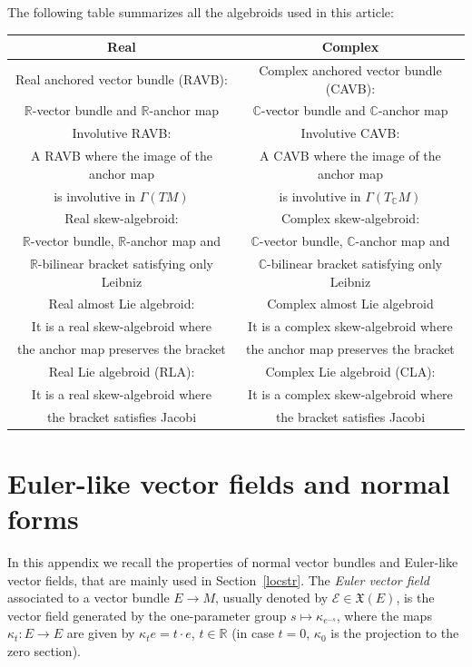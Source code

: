 \documentclass[11pt]{article}
\numberwithin{equation}{section}
\numberwithin{equation}{section}
\newcommand{\R}{{\mathbb{R}}}
\newcommand{\C}{{\mathbb{C}}}
\begin{document}
The following table summarizes all the algebroids used in this article:
\begin{center}
    \begin{tabular}{@{}c|c@{}}
      Real & Complex\\
      \hline
Real anchored vector bundle (RAVB): & Complex anchored vector bundle (CAVB):\\
$\R$-vector bundle and $\R$-anchor map & $\C$-vector bundle and $\C$-anchor map\\
\hline
Involutive RAVB: & Involutive CAVB:\\
A RAVB where the image of the anchor map & A CAVB where the image of the anchor map\\
 is involutive in $\Gamma(TM)$ & is involutive in $\Gamma(T_{\C}M)$ \\
\hline
 Real skew-algebroid: & Complex skew-algebroid: \\
$\R$-vector bundle, $\R$-anchor map and &
$\C$-vector bundle, $\C$-anchor map and\\
$\R$-bilinear bracket satisfying only Leibniz & $\C$-bilinear bracket satisfying only Leibniz \\
\hline
Real almost Lie algebroid: & Complex almost Lie algebroid \\
It is a real skew-algebroid where &
It is a complex skew-algebroid where\\
 the anchor map preserves the bracket & the anchor map preserves the bracket \\
\hline
Real Lie algebroid (RLA): & Complex Lie algebroid (CLA):\\
It is a real skew-algebroid where &
It is a complex skew-algebroid where\\
 the bracket satisfies Jacobi & the bracket satisfies Jacobi \\
\hline
    \end{tabular}
    \end{center}

\section{Euler-like vector fields and normal forms}\label{preliminarieslocstr}
 In this appendix we recall the properties of normal vector bundles and Euler-like vector fields, that are mainly used in Section~\ref{locstr}.
The {\em Euler vector field} associated to a vector bundle $E\to M$, usually denoted by $\mathcal{E}\in \mathfrak{X}(E)$, is the vector field generated by the one-parameter group $s\mapsto \kappa_{e^{-s}}$, where the maps $\kappa_{t}\colon E\to E$ are given by $\kappa_{t}e=t\cdot e$, $t\in \R$ (in case $t=0$, $\kappa_0$ is the projection to the zero section).
\end{document}
